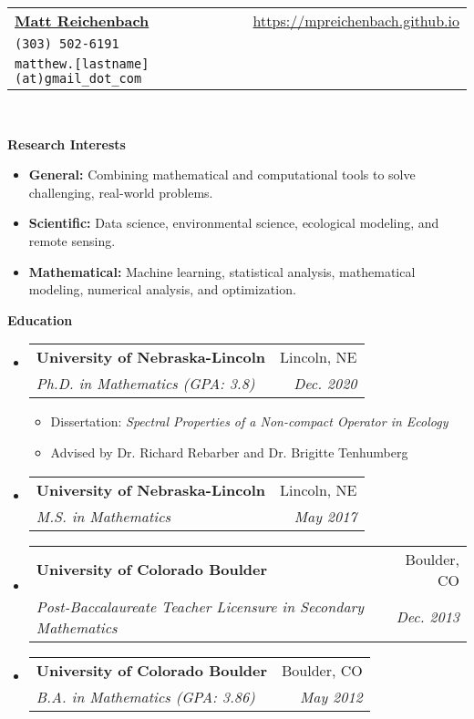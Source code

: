 \documentclass[letterpaper,11pt]{article}
\makeatletter
\newcommand{\resitem}[1]{\item #1 \vspace{-2pt}}
\newcommand{\resheading}[1]{{\large \colorbox{mygrey}{\begin{minipage}{\textwidth}{\textbf{#1 \vphantom{p\^{E}}}}\end{minipage}}}}
\newcommand{\ressubheading}[4]{
\begin{tabular*}{6.5in}{l@{\extracolsep{\fill}}r}
		\textbf{#1} & #2 \\
		\textit{#3} & \textit{#4} \\
\end{tabular*}\vspace{-6pt}}
\makeatother
\begin{document}
\thispagestyle{empty}
\newcommand{\mywebheader}{
\begin{tabular*}{7in}{l@{\extracolsep{\fill}}r}
	\textbf{\href{}{\LARGE Matt Reichenbach}} & \url{https://mpreichenbach.github.io} \\
    \texttt{(303) 502-6191} \\
    \texttt{matthew.[lastname](at)gmail\_dot\_com} \\
	\end{tabular*}
\\
\vspace{0.1in}}

\mywebheader

\resheading{Research Interests}
\begin{itemize}
	\resitem{\textbf{General:} Combining mathematical and computational tools to solve challenging, real-world problems.}
	
	\resitem{\textbf{Scientific:} Data science, environmental science,  ecological modeling, and remote sensing.}
	
	\resitem{\textbf{Mathematical:} Machine learning, statistical analysis, mathematical modeling, numerical analysis, and optimization.}
	
	
\end{itemize}

\resheading{Education}
	\begin{itemize}
		\item
			\ressubheading{University of Nebraska-Lincoln}{Lincoln, NE}{Ph.D. in Mathematics (GPA: 3.8)}{Dec. 2020}
				{ \footnotesize
				\begin{itemize}
					\resitem{Dissertation: \emph{Spectral Properties of a Non-compact Operator in Ecology}}
					\resitem{Advised by Dr. Richard Rebarber and Dr. Brigitte Tenhumberg}
				\end{itemize}}
		\item
		    	\ressubheading{University of Nebraska-Lincoln}{Lincoln, NE}{M.S. in Mathematics}{May 2017}
		\item
			\ressubheading{University of Colorado Boulder}{Boulder, CO}{Post-Baccalaureate Teacher Licensure in Secondary Mathematics}{Dec. 2013}
		\item
			\ressubheading{University of Colorado Boulder}{Boulder, CO}{B.A. in Mathematics (GPA: 3.86)}{May 2012}
			
	\end{itemize}
\end{document}
